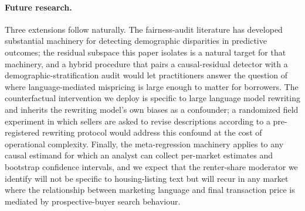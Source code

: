 \paragraph{Future research.} Three extensions follow naturally. The
fairness-audit literature has developed substantial machinery for
detecting demographic disparities in predictive outcomes; the residual
subspace this paper isolates is a natural target for that machinery,
and a hybrid procedure that pairs a causal-residual detector with a
demographic-stratification audit would let practitioners answer the
question of where language-mediated mispricing is large enough to
matter for borrowers. The counterfactual intervention we deploy is
specific to large language model rewriting and inherits the rewriting
model's own biases as a confounder; a randomized field experiment in
which sellers are asked to revise descriptions according to a
pre-registered rewriting protocol would address this confound at the
cost of operational complexity. Finally, the meta-regression
machinery applies to any causal estimand for which an analyst can
collect per-market estimates and bootstrap confidence intervals, and
we expect that the renter-share moderator we identify will not be
specific to housing-listing text but will recur in any market where
the relationship between marketing language and final transaction
price is mediated by prospective-buyer search behaviour.
